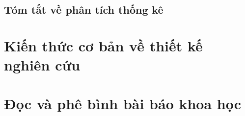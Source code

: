 \documentclass[
]{book}
\begin{document}
\hypertarget{tuxf3m-tux1eaft-vux1ec1-phuxe2n-tuxedch-thux1ed1ng-kuxea}{%
\section{Tóm tắt về phân tích thống kê}\label{tuxf3m-tux1eaft-vux1ec1-phuxe2n-tuxedch-thux1ed1ng-kuxea}}

\hypertarget{studyDesign}{%
\chapter{Kiến thức cơ bản về thiết kế nghiên cứu}\label{studyDesign}}

\hypertarget{appraisal}{%
\chapter{Đọc và phê bình bài báo khoa học}\label{appraisal}}

  
\end{document}
